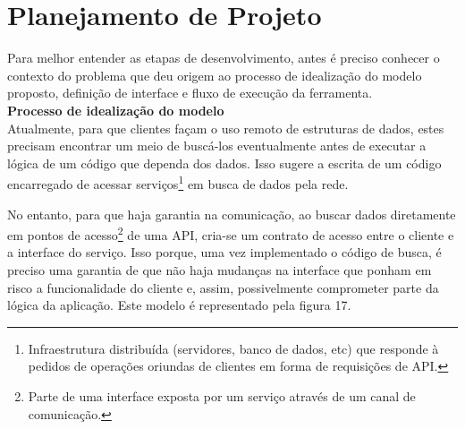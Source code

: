 \section{Planejamento de Projeto}

Para melhor entender as etapas de desenvolvimento, antes é preciso conhecer o contexto do problema que deu origem ao processo de idealização do modelo proposto, definição de interface e fluxo de execução da ferramenta. \\

\textbf{Processo de idealização do modelo} \\

Atualmente, para que clientes façam o uso remoto de estruturas de dados, estes precisam encontrar um meio de buscá-los eventualmente antes de executar a lógica de um código que dependa dos dados. Isso sugere a escrita de um código encarregado de acessar serviços\footnote{
  Infraestrutura distribuída (servidores, banco de dados, etc) que responde à pedidos de operações oriundas de clientes em forma de requisições de API.
} em busca de dados pela rede.

No entanto, para que haja garantia na comunicação, ao buscar dados diretamente em pontos de acesso\footnote{
  Parte de uma interface exposta por um serviço através de um canal de comunicação.
} de uma API, cria-se um contrato de acesso entre o cliente e a interface do serviço. Isso porque, uma vez implementado o código de busca, é preciso uma garantia de que não haja mudanças na interface que ponham em risco a funcionalidade do cliente e, assim, possivelmente comprometer parte da lógica da aplicação. Este modelo é representado pela figura 17.

